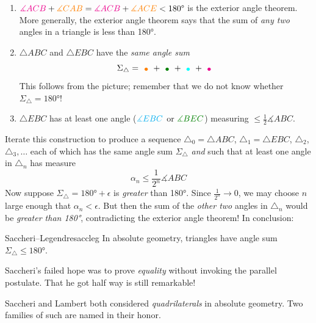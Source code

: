 \begin{enumerate}\def\lgbullet#1{\raisebox{-3pt}{\textcolor{#1}{\LARGE\textbullet}}}
  \item $\textcolor{magenta}{\measuredangle ACB}+\textcolor{orange}{\measuredangle CAB}=\textcolor{magenta}{\measuredangle ACB}+\textcolor{orange}{\measuredangle ACE}<\ang{180}$ is the exterior angle theorem. More generally, the exterior angle theorem says that the sum of \emph{any two} angles in a triangle is less than \ang{180}.
  \item $\triangle ABC$ and $\triangle EBC$ have the \emph{same angle sum}
  \[\Sigma_\triangle=\lgbullet{orange}+\lgbullet{Green} +\lgbullet{Cyan} +\lgbullet{magenta}\]
  This follows from the picture; remember that we do not know whether $\Sigma_\triangle=\ang{180}$! %
  \item $\triangle EBC$ has at least one angle ($\textcolor{cyan}{\measuredangle EBC}$ or $\textcolor{Green}{\measuredangle BEC}$) measuring $\le\frac 12\measuredangle ABC$.
\end{enumerate}
Iterate this construction to produce a sequence $\triangle_0=\triangle ABC$, $\triangle_1=\triangle EBC$, $\triangle_2$, $\triangle_3,\ldots$ each of which has the same angle sum $\Sigma_\triangle$ \emph{and} such that at least one angle in $\triangle_n$ has measure
\[\alpha_n\le\frac 1{2^n}\measuredangle ABC\]
Now suppose $\Sigma_\triangle=\ang{180}+\epsilon$ is \emph{greater} than \ang{180}. Since $\frac 1{2^n}\to 0$, we may choose $n$ large enough that $\alpha_n<\epsilon$. But then the sum of the \emph{other two} angles in $\triangle_n$ would be \emph{greater than \ang{180}}, contradicting the exterior angle theorem! In conclusion:

\begin{thm}{Saccheri--Legendre}{saccleg}
In absolute geometry, triangles have angle sum $\Sigma_\triangle\le \ang{180}$.
\end{thm}

Saccheri's failed hope was to prove \emph{equality} without invoking the parallel postulate. That he got half way is still remarkable!


Saccheri and Lambert both considered \emph{quadrilaterals} in absolute geometry. Two families of such are named in their honor.

